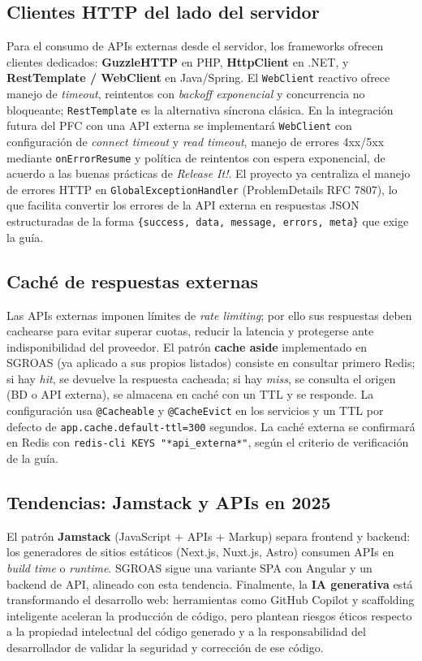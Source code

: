 \subsection{Clientes HTTP del lado del servidor}

Para el consumo de APIs externas desde el servidor, los frameworks ofrecen clientes dedicados: \textbf{GuzzleHTTP}
en PHP, \textbf{HttpClient} en .NET, y \textbf{RestTemplate / WebClient} en Java/Spring. El \texttt{WebClient}
reactivo ofrece manejo de \textit{timeout}, reintentos con \textit{backoff exponencial} y concurrencia no
bloqueante; \texttt{RestTemplate} es la alternativa síncrona clásica. En la integración futura del PFC con una API
externa se implementará \texttt{WebClient} con configuración de \textit{connect timeout} y \textit{read timeout},
manejo de errores 4xx/5xx mediante \texttt{onErrorResume} y política de reintentos con espera exponencial, de
acuerdo a las buenas prácticas de \textit{Release It!}. El proyecto ya centraliza el manejo de errores HTTP en
\texttt{GlobalExceptionHandler} (ProblemDetails RFC 7807), lo que facilita convertir los errores de la API externa
en respuestas JSON estructuradas de la forma \texttt{\{success, data, message, errors, meta\}} que exige la guía.

\subsection{Caché de respuestas externas}

Las APIs externas imponen límites de \textit{rate limiting}; por ello sus respuestas deben cachearse para evitar
superar cuotas, reducir la latencia y protegerse ante indisponibilidad del proveedor. El patrón \textbf{cache
aside} implementado en SGROAS (ya aplicado a sus propios listados) consiste en consultar primero Redis; si hay
\textit{hit}, se devuelve la respuesta cacheada; si hay \textit{miss}, se consulta el origen (BD o API externa), se
almacena en caché con un TTL y se responde. La configuración usa \texttt{@Cacheable} y \texttt{@CacheEvict} en los
servicios y un TTL por defecto de \texttt{app.cache.default-ttl=300} segundos. La caché externa se confirmará en
Redis con \texttt{redis-cli KEYS "*api\_externa*"}, según el criterio de verificación de la guía.

\subsection{Tendencias: Jamstack y APIs en 2025}

El patrón \textbf{Jamstack} (JavaScript + APIs + Markup) separa frontend y backend: los generadores de sitios
estáticos (Next.js, Nuxt.js, Astro) consumen APIs en \textit{build time} o \textit{runtime}. SGROAS sigue una
variante SPA con Angular y un backend de API, alineado con esta tendencia. Finalmente, la \textbf{IA generativa}
está transformando el desarrollo web: herramientas como GitHub Copilot y scaffolding inteligente aceleran la
producción de código, pero plantean riesgos éticos respecto a la propiedad intelectual del código generado y a la
responsabilidad del desarrollador de validar la seguridad y corrección de ese código.